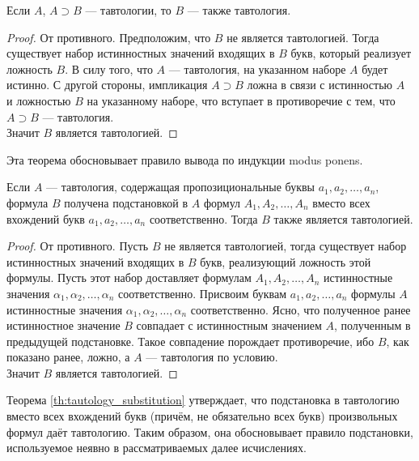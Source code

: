 \begin{theorem}\label{th:modus_ponens}
    Если $A$, $A \supset B$ --- тавтологии, то $B$ --- также тавтология.
\end{theorem}
\begin{proof}
    От противного. Предположим, что $B$ не является тавтологией. Тогда существует набор истинностных значений входящих в $B$ букв, который реализует ложность $B$. В силу того, что $A$ --- тавтология, на указанном наборе $A$ будет истинно. С другой стороны, импликация $A \supset B$ ложна в связи с истинностью $A$ и ложностью $B$ на указанному наборе, что вступает в противоречие с тем, что $A \supset B$ --- тавтология. \\
    Значит $B$ является тавтологией.
\end{proof}

Эта теорема обосновывает правило вывода по индукции modus ponens.

\begin{theorem}\label{th:tautology_substitution}
    Если $A$ --- тавтология, содержащая пропозициональные буквы $a_1, a_2, \dots, a_n$, формула $B$ получена подстановкой в $A$ формул $A_1, A_2, \dots, A_n$ вместо всех вхождений букв $a_1, a_2, \dots, a_n$ соответственно. Тогда $B$ также является тавтологией.
\end{theorem}
\begin{proof}
    От противного. Пусть $B$ не является тавтологией, тогда существует набор истинностных значений входящих в $B$ букв, реализующий ложность этой формулы. Пусть этот набор доставляет формулам $A_1, A_2, \dots, A_n$ истинностные значения $\alpha_1, \alpha_2, \dots, \alpha_n$ соответственно. Присвоим буквам $a_1, a_2, \dots, a_n$ формулы $A$ истинностные значения $\alpha_1, \alpha_2, \dots, \alpha_n$ соответственно. Ясно, что полученное ранее истинностное значение $B$ совпадает с истинностным значением $A$, полученным в предыдущей подстановке. Такое совпадение порождает противоречие, ибо $B$, как показано ранее, ложно, а $A$ --- тавтология по условию. \\
    Значит $B$ является тавтологией.
\end{proof}

Теорема \ref{th:tautology_substitution} утверждает, что подстановка в тавтологию вместо всех вхождений букв (причём, не обязательно всех букв) произвольных формул даёт тавтологию. Таким образом, она обосновывает правило подстановки, используемое неявно в рассматриваемых далее исчислениях.